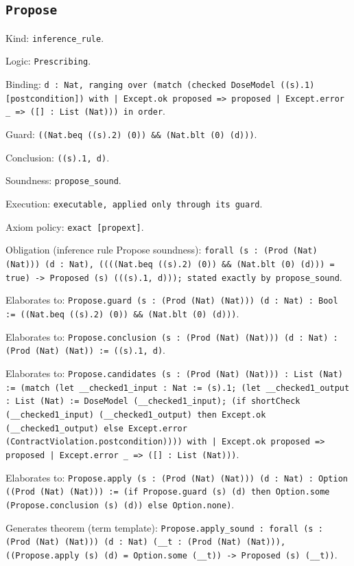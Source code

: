 \documentclass[11pt]{article}
\begin{document}
\subsection*{\texttt{Propose}}
\noindent Kind: \texttt{inference_rule}.\par
\noindent Logic: \texttt{Prescribing}.\par
\noindent Binding: \texttt{d : Nat, ranging over (match (checked DoseModel ((s).1) [postcondition]) with | Except.ok proposed => proposed | Except.error \_ => ([] : List (Nat))) in order}.\par
\noindent Guard: \texttt{((Nat.beq ((s).2) (0)) \&\& (Nat.blt (0) (d)))}.\par
\noindent Conclusion: \texttt{((s).1, d)}.\par
\noindent Soundness: \texttt{propose\_sound}.\par
\noindent Execution: \texttt{executable, applied only through its guard}.\par
\noindent Axiom policy: \texttt{exact [propext]}.\par
\noindent Obligation (inference rule Propose soundness): \texttt{forall (s : (Prod (Nat) (Nat))) (d : Nat), ((((Nat.beq ((s).2) (0)) \&\& (Nat.blt (0) (d))) = true) -> Proposed (s) (((s).1, d))); stated exactly by propose\_sound}.\par
\noindent Elaborates to: \texttt{Propose.guard (s : (Prod (Nat) (Nat))) (d : Nat) : Bool := ((Nat.beq ((s).2) (0)) \&\& (Nat.blt (0) (d)))}.\par
\noindent Elaborates to: \texttt{Propose.conclusion (s : (Prod (Nat) (Nat))) (d : Nat) : (Prod (Nat) (Nat)) := ((s).1, d)}.\par
\noindent Elaborates to: \texttt{Propose.candidates (s : (Prod (Nat) (Nat))) : List (Nat) := (match (let \_\_checked1\_input : Nat := (s).1; (let \_\_checked1\_output : List (Nat) := DoseModel (\_\_checked1\_input); (if shortCheck (\_\_checked1\_input) (\_\_checked1\_output) then Except.ok (\_\_checked1\_output) else Except.error (ContractViolation.postcondition)))) with | Except.ok proposed => proposed | Except.error \_ => ([] : List (Nat)))}.\par
\noindent Elaborates to: \texttt{Propose.apply (s : (Prod (Nat) (Nat))) (d : Nat) : Option ((Prod (Nat) (Nat))) := (if Propose.guard (s) (d) then Option.some (Propose.conclusion (s) (d)) else Option.none)}.\par
\noindent Generates theorem (term template): \texttt{Propose.apply\_sound : forall (s : (Prod (Nat) (Nat))) (d : Nat) (\_\_t : (Prod (Nat) (Nat))), ((Propose.apply (s) (d) = Option.some (\_\_t)) -> Proposed (s) (\_\_t))}.\par
\end{document}
